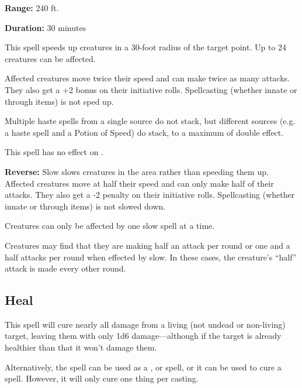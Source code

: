 \begin{multicols*}{2}
{\textbf{Range:} 240 ft.

\textbf{Duration:} 30 minutes}

This spell speeds up creatures in a 30-foot radius of the target point. Up to 24 creatures can be affected.

Affected creatures move twice their speed and can make twice as many attacks. They also get a +2 bonus on their initiative rolls. Spellcasting (whether innate or through items) is not sped up.

Multiple haste spells from a single source do not stack, but different sources (e.g. a haste spell and a Potion of Speed) do stack, to a maximum of double effect.

This spell has no effect on .

\textbf{Reverse:} \hypertarget{spell:Slow}{Slow} slows creatures in the area rather than speeding them up. Affected creatures move at half their speed and can only make half of their attacks. They also get a -2 penalty on their initiative rolls. Spellcasting (whether innate or through items) is not slowed down.

Creatures can only be affected by one slow spell at a time.

Creatures may find that they are making half an attack per round or one and a half attacks per round when effected by slow. In these cases, the creature’s “half” attack is made every other round.

\subsection{Heal}\label{spell:Heal}

This spell will cure nearly all damage from a living (not undead or non-living) target, leaving them with only 1d6 damage—although if the target is already healthier than that it won’t damage them.

Alternatively, the spell can be used as a ,  or  spell, or it can be used to cure a  spell. However, it will only cure one thing per casting.


\end{multicols*}
